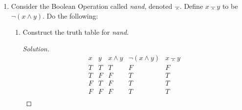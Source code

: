 \documentclass[12pt]{article}
\renewcommand\qedsymbol{$\blacksquare$}
\newenvironment{solution}
{\begin{proof}[Solution]\renewcommand\qedsymbol{$\square$}}
	{\end{proof}}
\begin{document}
\begin{enumerate}
\begin{proof}
	Since the truth values are identical in the last two columns, we can conclude that $x \lor y$ is equalvalent to $ \lnot ( \lnot x \land \lnot y ) $, which only composed of two basic operations $\land$ and $\lnot$. 
	\end{proof}
	\item
	Consider the Boolean Operation called \emph{nand}, denoted $\barwedge$. Define $x \barwedge y$ to be $\lnot (x\land y)$. Do the following:
	\begin{enumerate}
		\item Construct the truth table for \emph{nand}.
		\begin{solution}
				\begin{displaymath}
				\begin{array}{c|c|c|c|c}
					x & y & x \land y& \lnot ( x \land y) &x \barwedge y\\
					\hline  
					T & T &T&F&F\\
					T & F &F&T&T\\ 
					F & T &F&T&T\\
					F & F &F&T&T\\
				\end{array}	
			\end{displaymath}


\end{solution}
\end{enumerate}
\end{enumerate}
\end{document}
